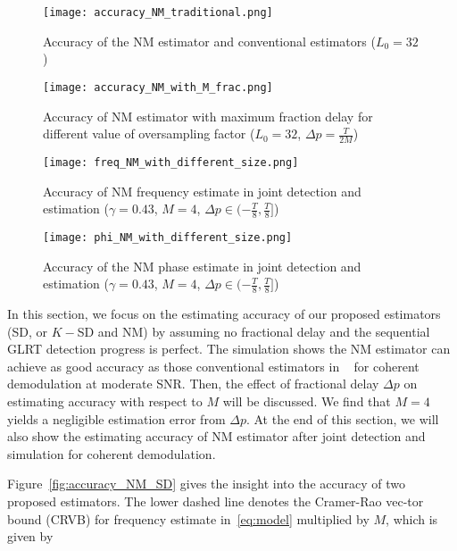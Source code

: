 \begin{figure}[t]
    \centerline{\texttt{[image: accuracy\_NM\_traditional.png]}}
    \caption{Accuracy of the NM estimator and conventional estimators ($L_0=32$)}
    \label{fig:accuracy_NM_traditional}
    \end{figure}

\begin{figure}[t]
    \centerline{\texttt{[image: accuracy\_NM\_with\_M\_frac.png]}}
    \caption{Accuracy of NM estimator with maximum fraction delay for different value of oversampling factor ($L_0=32$, $\Delta p=\frac{T}{2M}$)}
    \label{fig:accuracy_NM_with_M_frac}
    \end{figure}

\begin{figure}[t]
    \centerline{\texttt{[image: freq\_NM\_with\_different\_size.png]}}
    \caption{Accuracy of NM frequency estimate in joint detection and estimation ($\gamma=0.43$, $M=4$, $\Delta p \in (-\frac{T}{8},\frac{T}{8}]$)}
    \label{fig:accuracy_freq_NM_joint}
    \end{figure}

\begin{figure}[t]
    \centerline{\texttt{[image: phi\_NM\_with\_different\_size.png]}}
    \caption{Accuracy of the NM phase estimate in joint detection and estimation ($\gamma=0.43$, $M=4$, $\Delta p \in (-\frac{T}{8},\frac{T}{8}]$)}
    \label{fig:accuracy_phi_NM_joint}
    \end{figure}

In this section, we focus on the estimating accuracy of our proposed estimators (SD, or $K-$SD and NM)
by assuming no fractional delay and the sequential GLRT detection progress is perfect.
The simulation shows the NM estimator can achieve as good accuracy as those conventional estimators in ~\cite{Kay_89,Luise_Reggiannini_95,Fitz_94}
for coherent demodulation at moderate SNR. 
Then, the effect of fractional delay $\Delta p$ on estimating accuracy with respect to $M$ will be discussed.
We find that $M=4$ yields a negligible estimation error from $\Delta p$.
At the end of this section, we will also show the estimating accuracy of NM estimator after joint detection and simulation for coherent demodulation.  

Figure~\ref{fig:accuracy_NM_SD} gives the insight into the accuracy of two proposed estimators.
The lower dashed line denotes the Cramer-Rao vec-tor bound (CRVB) for frequency estimate in~\eqref{eq:model}
multiplied by $M$, which is given by

